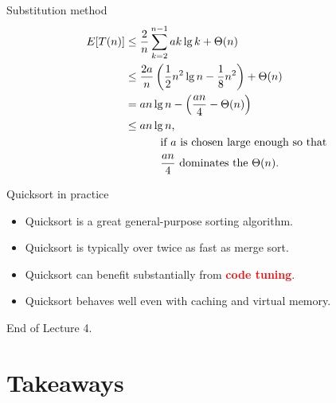 \documentclass{beamer}
\begin{document}
\begin{frame}{Substitution method}
    \begin{equation*}
        \begin{split}
        E[T(n)] &\leq \frac{2}{n}\sum\limits_{k=2}^{n-1} a k \lg k + \Theta(n) \\
                &\leq \frac{2a}{n} \left( \frac{1}{2}n^2 \lg n - \frac{1}{8}n^2 \right) + \Theta(n) \\
                &= a n \lg n - \left( \frac{an}{4} - \Theta(n) \right) \\
                &\leq a n \lg n \text{,} \\
                &\text{\hspace{10mm} if $a$ is chosen large enough so that} \\
                &\text{\hspace{10mm} $\frac{an}{4}$ dominates the $\Theta(n)$.}
        \end{split}
    \end{equation*}
\end{frame}

\begin{frame}{Quicksort in practice}
    \begin{itemize}
        \item Quicksort is a great general-purpose sorting algorithm. \pause
        \item Quicksort is typically over twice as fast as merge sort. \pause
        \item Quicksort can benefit substantially from \textcolor{red}{\textbf{code tuning}}. \pause
        \item Quicksort behaves well even with caching and virtual memory.
    \end{itemize}
\end{frame}

\begin{frame}{}
    \centering
    \Huge End of Lecture 4.
\end{frame}

\section*{Takeaways}
\end{document}
